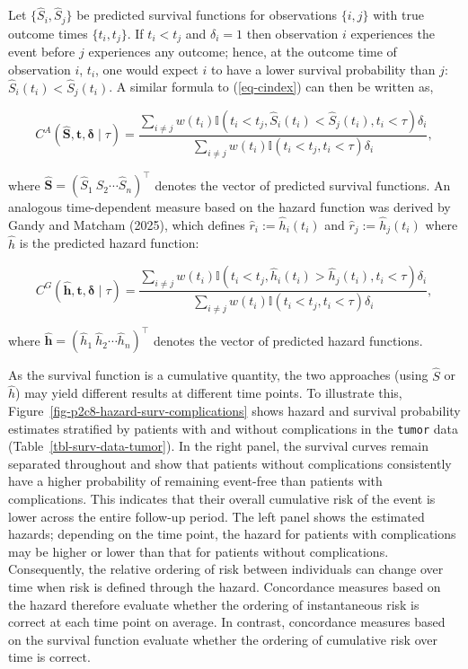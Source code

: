 \documentclass[
  letterpaper,
  krantz2]{style/krantz}
\begin{document}
Let \(\{\hat{S}_i, \hat{S}_j\}\) be predicted survival functions for
observations \(\{i,j\}\) with true outcome times \(\{t_i, t_j\}\). If
\(t_i < t_j\) and \(\delta_i=1\) then observation \(i\) experiences the
event before \(j\) experiences any outcome; hence, at the outcome time
of observation \(i\), \(t_i\), one would expect \(i\) to have a lower
survival probability than \(j\): \(\hat{S}_i(t_i) < \hat{S}_j(t_i)\). A
similar formula to (\ref{eq-cindex}) can then be written as,

\[
C^A(\mathbf{\hat{S}}, \mathbf{t}, \boldsymbol{\delta}\mid \tau) = \frac{\sum_{i\neq j} w(t_i)\mathbb{I}(t_i < t_j, \hat{S}_i(t_i) < \hat{S}_j(t_i), t_i < \tau)\delta_i}{\sum_{i\neq j}w(t_i)\mathbb{I}(t_i < t_j, t_i < \tau)\delta_i},
\]

where
\(\boldsymbol{\mathbf{\hat{S}}} = ({\hat{S}}_1 \ {\hat{S}}_2 \cdots {\hat{S}}_{n})^\top\)
denotes the vector of predicted survival
functions. An analogous time-dependent measure
based on the hazard function was derived by Gandy and Matcham (2025),
which defines \(\hat{r}_i := \hat{h}_i(t_i)\) and
\(\hat{r}_j := \hat{h}_j(t_i)\) where \(\hat{h}\) is the predicted
hazard function:

\[
C^G(\mathbf{\hat{h}}, \mathbf{t}, \boldsymbol{\delta}\mid \tau) = \frac{\sum_{i\neq j} w(t_i)\mathbb{I}(t_i < t_j, \hat{h}_i(t_i) > \hat{h}_j(t_i), t_i < \tau)\delta_i}{\sum_{i\neq j}w(t_i)\mathbb{I}(t_i < t_j, t_i < \tau)\delta_i},
\]

where
\(\boldsymbol{\mathbf{\hat{h}}} = ({\hat{h}}_1 \ {\hat{h}}_2 \cdots {\hat{h}}_{n})^\top\)
denotes the vector of predicted hazard functions.

As the survival function is a cumulative quantity, the two approaches
(using \(\hat{S}\) or \(\hat{h}\)) may yield different results at
different time points. To illustrate this,
Figure~\ref{fig-p2c8-hazard-surv-complications} shows hazard and
survival probability estimates stratified by patients with and without
complications in the \texttt{tumor} data
(Table~\ref{tbl-surv-data-tumor}). In the right panel, the survival
curves remain separated throughout and show that patients without
complications consistently have a higher probability of remaining
event-free than patients with complications. This indicates that their
overall cumulative risk of the event is lower across the entire
follow-up period. The left panel shows the estimated hazards; depending
on the time point, the hazard for patients with complications may be
higher or lower than that for patients without complications.
Consequently, the relative ordering of risk between individuals can
change over time when risk is defined through the hazard. Concordance
measures based on the hazard therefore evaluate whether the ordering of
instantaneous risk is correct at each time point on average. In
contrast, concordance measures based on the survival function evaluate
whether the ordering of cumulative risk over time is correct.
\end{document}
